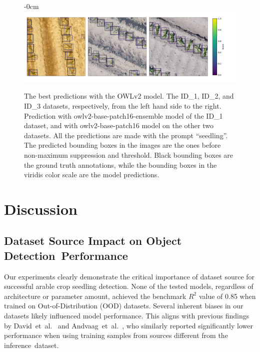 \documentclass[12pt,a4paper,oneside]{report}
\newlength{\extralength}
\begin{document}
\vspace{-17pt}
\unskip

\begin{figure}[H]
  \begin{adjustwidth}{-\extralength}{0cm}
   \centering
  \includegraphics[width=16cm]{Plots/zeroshot_images.pdf}
  \end{adjustwidth}
  \caption{The best predictions with the OWLv2 model.  
  The ID\_1, ID\_2, and ID\_3 datasets, respectively, from the left hand side to the right.
  Prediction with owlv2-base-patch16-ensemble model of the ID\_1 dataset,
  and with owlv2-base-patch16 model on the other two datasets.
  All the predictions are made with the prompt ``seedling''.
  The predicted bounding boxes in the images are the ones before 
  non-maximum suppression and threshold.
  Black bounding boxes are the ground truth annotations, while the bounding boxes 
  in the viridis color scale are the model predictions.}
  \label{fig:annotations_zero-shot}

\end{figure}
\unskip

\section{Discussion}
\unskip

\subsection{Dataset Source Impact on Object Detection~Performance}
Our experiments clearly demonstrate the critical importance of dataset source 
for successful arable crop seedling detection. None of the tested models, regardless 
of architecture or parameter amount, achieved the benchmark $R^2$ value of 0.85 
when trained on Out-of-Distribution (OOD) datasets. 
Several inherent biases in our datasets likely influenced model performance.
This aligns with previous findings 
by David~et~al.~\cite{davidPlantDetectionCounting2021}  and Andvaag~et~al.~\cite{andvaagCountingCanolaGeneralizable2024}, 
who similarly reported significantly 
lower performance when using training samples from sources different from the inference~dataset.
\end{document}
